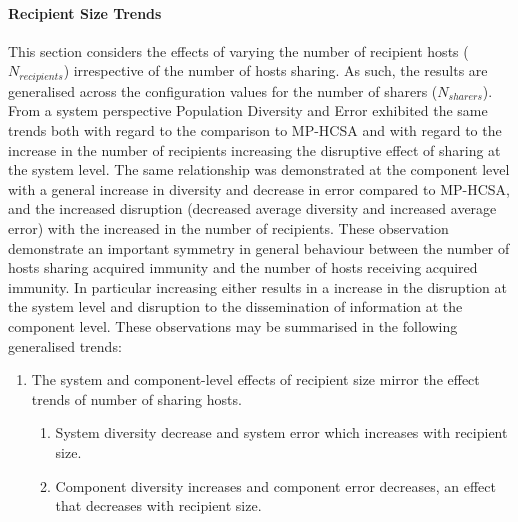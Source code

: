 %
%
\paragraph{Recipient Size Trends}
This section considers the effects of varying the number of recipient hosts ($N_{recipients}$) irrespective of the number of hosts sharing. As such, the results are generalised across the configuration values for the number of sharers ($N_{sharers}$). 
From a system perspective Population Diversity and Error exhibited the same trends both with regard to the comparison to MP-HCSA and with regard to the increase in the number of recipients increasing the disruptive effect of sharing at the system level.
The same relationship was demonstrated at the component level with a general increase in diversity and decrease in error compared to MP-HCSA, and the increased disruption (decreased average diversity and increased average error) with the increased in the number of recipients.
These observation demonstrate an important symmetry in general behaviour between the number of hosts sharing acquired immunity and the number of hosts receiving acquired immunity. In particular increasing either results in a increase in the disruption at the system level and disruption to the dissemination of information at the component level. These observations may be summarised in the following generalised trends:

\begin{enumerate}
	\item The system and component-level effects of recipient size mirror the effect trends of number of sharing hosts. 		
	\begin{enumerate}
		\item System diversity decrease and system error which increases with recipient size. 
		\item Component diversity increases and component error decreases, an effect that decreases with recipient size.
	\end{enumerate}
\end{enumerate}

%
%
